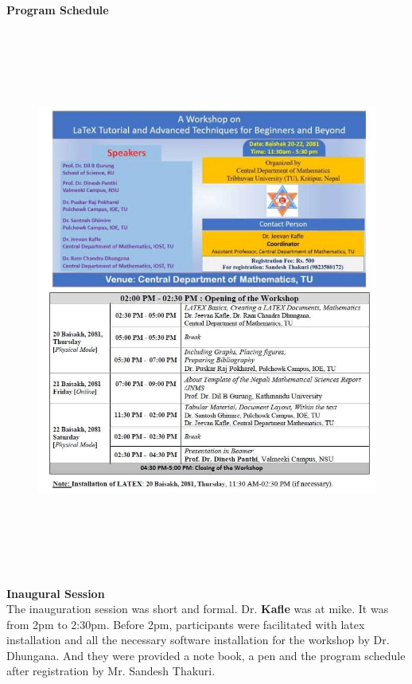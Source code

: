 \documentclass[a4paper,12pt]{report}
\begin{document}
\vspace{15mm}
{\Large \textbf{Program Schedule}}\\
\begin{figure}[h!]
  \centering
  \includegraphics[width=17cm, height=18cm]{schedule.jpg}
\end{figure}
\clearpage


{\bfseries \Large Inaugural Session}\\[3mm]
The inauguration session was short and formal. Dr. \textbf{Kafle} was at mike. It was from 2pm to 2:30pm. Before 2pm, participants were facilitated with latex installation and all the necessary software installation for the workshop by Dr. Dhungana. And they were provided a note book, a pen and the program schedule after registration by Mr. Sandesh Thakuri.\\[2mm]
\end{document}
